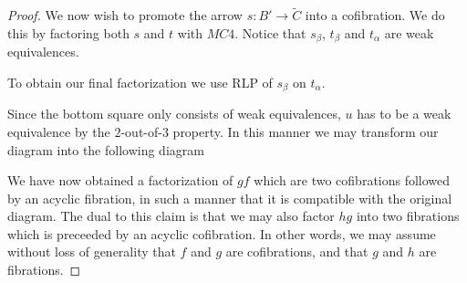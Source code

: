 \documentclass[../thesis.tex]{subfiles}
\begin{document}
\begin{proof}
                We now wish to promote the arrow $s:B'\rightarrow \widetilde{C}$ into a cofibration. We do this by factoring both $s$ and $t$ with $MC4$. Notice that $s_\beta$, $t_\beta$ and $t_\alpha$ are weak equivalences.
                \begin{center}
                \end{center}

                To obtain our final factorization we use RLP of $s_\beta$ on $t_\alpha$.
                \begin{center}
                \end{center}

                Since the bottom square only consists of weak equivalences, $u$ has to be a weak equivalence by the $2$-out-of-$3$ property. In this manner we may transform our diagram into the following diagram
                \begin{center}
                \end{center}
                We have now obtained a factorization of $gf$ which are two cofibrations followed by an acyclic fibration, in such a manner that it is compatible with the original diagram. The dual to this claim is that we may also factor $hg$ into two fibrations which is preceeded by an acyclic cofibration. In other words, we may assume without loss of generality that $f$ and $g$ are cofibrations, and that $g$ and $h$ are fibrations.
                

\end{proof}
\end{document}
